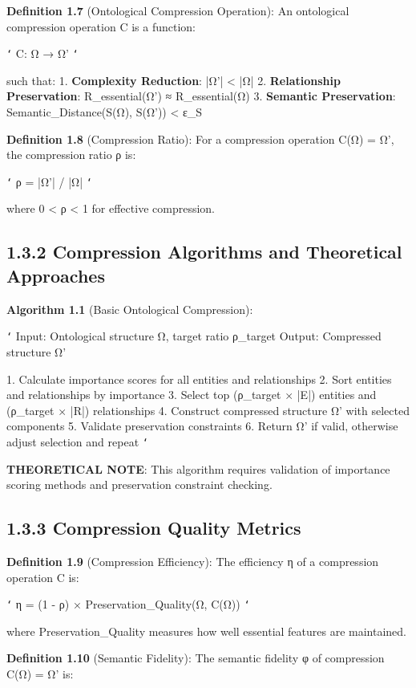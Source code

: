 \textbf{Definition 1.7} (Ontological Compression Operation): An ontological compression operation C is a function:

\texttt{`}
C: Ω → Ω'
\texttt{`}

such that:
1. \textbf{Complexity Reduction}: |Ω'| < |Ω|
2. \textbf{Relationship Preservation}: R_essential(Ω') ≈ R_essential(Ω)
3. \textbf{Semantic Preservation}: Semantic_Distance(S(Ω), S(Ω')) < ε_S

\textbf{Definition 1.8} (Compression Ratio): For a compression operation C(Ω) = Ω', the compression ratio ρ is:

\texttt{`}
ρ = |Ω'| / |Ω|
\texttt{`}

where 0 < ρ < 1 for effective compression.

\subsection{1.3.2 Compression Algorithms and Theoretical Approaches}

\textbf{Algorithm 1.1} (Basic Ontological Compression):

\texttt{`}
Input: Ontological structure Ω, target ratio ρ_target
Output: Compressed structure Ω'

1. Calculate importance scores for all entities and relationships
2. Sort entities and relationships by importance
3. Select top (ρ_target × |E|) entities and (ρ_target × |R|) relationships
4. Construct compressed structure Ω' with selected components
5. Validate preservation constraints
6. Return Ω' if valid, otherwise adjust selection and repeat
\texttt{`}

\textbf{THEORETICAL NOTE}: This algorithm requires validation of importance scoring methods and preservation constraint checking.

\subsection{1.3.3 Compression Quality Metrics}

\textbf{Definition 1.9} (Compression Efficiency): The efficiency η of a compression operation C is:

\texttt{`}
η = (1 - ρ) × Preservation_Quality(Ω, C(Ω))
\texttt{`}

where Preservation_Quality measures how well essential features are maintained.

\textbf{Definition 1.10} (Semantic Fidelity): The semantic fidelity φ of compression C(Ω) = Ω' is:

